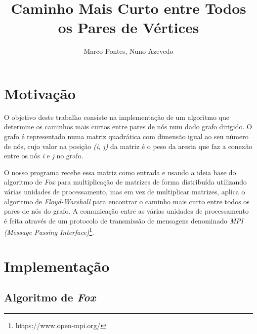 \documentclass{llncs}
\begin{document}
\pagestyle{plain}


\title{\huge{Caminho Mais Curto entre Todos os Pares de Vértices}}
\author{\Large{Marco Pontes, Nuno Azevedo}}
\maketitle


\newpage

\section{Motivação}
O objetivo deste trabalho consiste na implementação de um algoritmo que determine os caminhos mais curtos entre pares de nós num dado grafo dirigido. O grafo é representado numa matriz quadrática com dimensão igual ao seu número de nós, cujo valor na posição \textit{(i, j)} da matriz é o peso da aresta que faz a conexão entre os nós \textit{i} e \textit{j} no grafo.

O nosso programa recebe essa matriz como entrada e usando a ideia base do algoritmo de \textit{Fox} para multiplicação de matrizes de forma distribuída utilizando várias unidades de processamento, mas em vez de multiplicar matrizes, aplica o algoritmo de \textit{Floyd-Warshall} para encontrar o caminho mais curto entre todos os pares de nós do grafo. A comunicação entre as várias unidades de processamento é feita através de um protocolo de transmissão de mensagens denominado \textit{MPI (Message Passing Interface)}\footnote{https://www.open-mpi.org/}.

\section{Implementação}
\subsection{Algoritmo de \textit{Fox}}
\end{document}
